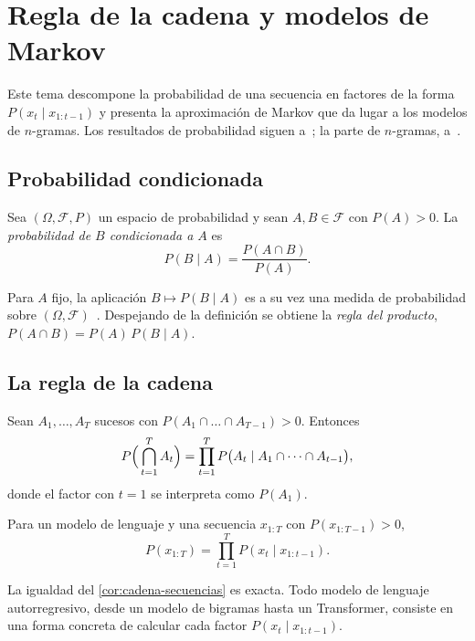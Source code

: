 \chapter{Regla de la cadena y modelos de Markov}
\label{tema:2}

Este tema descompone la probabilidad de una secuencia en factores de la forma $P(x_t\mid x_{1:t-1})$ y presenta la aproximación de Markov que da lugar a los modelos de $n$-gramas. Los resultados de probabilidad siguen a~\cite[§1.3]{bt}; la parte de $n$-gramas, a~\cite[§3.1]{jm3}.

\section{Probabilidad condicionada}

\begin{definicion}
Sea $(\Omega,\mathcal{F},P)$ un espacio de probabilidad y sean $A,B\in\mathcal{F}$ con $P(A)>0$. La \emph{probabilidad de $B$ condicionada a $A$} es
\[
P(B\mid A)=\frac{P(A\cap B)}{P(A)}.
\]
\end{definicion}

Para $A$ fijo, la aplicación $B\mapsto P(B\mid A)$ es a su vez una medida de probabilidad sobre $(\Omega,\mathcal{F})$~\cite[§1.3]{bt}. Despejando de la definición se obtiene la \emph{regla del producto}, $P(A\cap B)=P(A)\,P(B\mid A)$.

\section{La regla de la cadena}

\begin{teorema}\label{teo:cadena}
Sean $A_1,\dots,A_T$ sucesos con $P(A_1\cap\dots\cap A_{T-1})>0$. Entonces
\[
P\Bigl(\,\bigcap_{t=1}^{T}A_t\Bigr)=\prod_{t=1}^{T}P\bigl(A_t\mid A_1\cap\dots\cap A_{t-1}\bigr),
\]
donde el factor con $t=1$ se interpreta como $P(A_1)$.
\end{teorema}

\begin{corolario}\label{cor:cadena-secuencias}
Para un modelo de lenguaje y una secuencia $x_{1:T}$ con $P(x_{1:T-1})>0$,
\[
P(x_{1:T})=\prod_{t=1}^{T}P(x_t\mid x_{1:t-1}).
\]
\end{corolario}

La igualdad del \cref{cor:cadena-secuencias} es exacta. Todo modelo de lenguaje autorregresivo, desde un modelo de bigramas hasta un Transformer, consiste en una forma concreta de calcular cada factor $P(x_t\mid x_{1:t-1})$.

